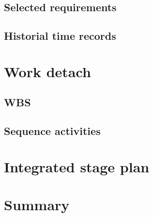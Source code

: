 \documentclass[twocolumn]{article}
\begin{document}
\subsection{Selected requirements}
\subsection{Historial time records}

\section{Work detach}
\subsection{WBS}
\subsection{Sequence activities}
\section{Integrated stage plan}

\section{Summary}


\end{document}
